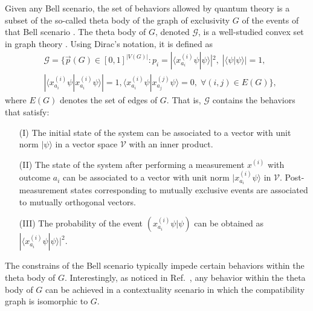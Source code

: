\documentclass[prl,letterpaper,english,reprint,nofootinbib,aps,superscriptaddress,showpacs,showkeys]{revtex4-1}
\theoremstyle{definition}
\theoremstyle{remark}
\begin{document}
Given any Bell scenario, the set of behaviors allowed by quantum theory is a subset of the so-called theta body of the graph of exclusivity $G$ of the events of that Bell scenario \cite{CSW14}.
The theta body of $G$, denoted $\mathcal{G}$, is a well-studied convex set in graph theory \cite{GLS88,GLS86,Knuth94}.
Using Dirac's notation, it is defined as
\begin{eqnarray*} \label{thb}
&\mathcal{G} = \{ \vec{p}(G) \in [0,1]^{|V(G)|} : p_i = |\langle x^{(i)}_{a_i} \psi | \psi \rangle|^2,\; |\langle \psi| \psi \rangle| = 1,\\
&|\langle x^{(i)}_{a_i}\psi | x^{(i)}_{a_i}\psi \rangle| = 1,\langle x^{(i)}_{a_i}\psi | x^{(j)}_{a_j}\psi \rangle = 0,\;\forall (i,j) \in E(G) \},
\end{eqnarray*}
where $E(G)$ denotes the set of edges of $G$. That is, $\mathcal{G}$ contains the behaviors that satisfy:
\begin{itemize}
 \item[(I)] The initial state of the system can be associated to a vector with unit norm $| \psi \rangle$ in a vector space ${\mathcal V}$ with an inner product.
 \item[(II)] The state of the system after performing a measurement $x^{(i)}$ with outcome $a_i$ can be associated to a vector with unit norm $ | x^{(i)}_{a_i}\psi \rangle$ in ${\mathcal V}$. Post-measurement states corresponding to mutually exclusive events are associated to mutually orthogonal vectors.
 \item[(III)] The probability of the event $(x^{(i)}_{a_i} \psi | \psi)$ can be obtained as $|\langle x^{(i)}_{a_i} \psi | \psi \rangle|^2$.
\end{itemize}
The constrains of the Bell scenario typically impede certain behaviors within the theta body of $G$. Interestingly, as noticed in Ref.\ \cite{CSW14}, any behavior within the theta body of $G$ can be achieved in a contextuality scenario in which the compatibility graph is isomorphic to $G$.
\end{document}
